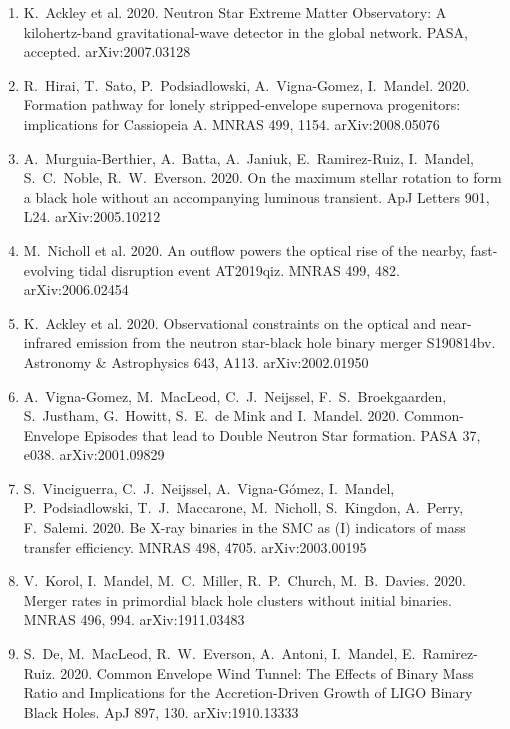 \documentclass[margin,line]{res}
\begin{document}
\begin{resume}
\begin{enumerate}
\item K.~Ackley et al. 2020. Neutron Star Extreme Matter Observatory: A kilohertz-band gravitational-wave detector in the global network. PASA, accepted.  arXiv:2007.03128 

\item R.~Hirai, T.~Sato, P.~Podsiadlowski, A.~Vigna-Gomez, I.~Mandel. 2020. Formation pathway for lonely stripped-envelope supernova progenitors: implications for Cassiopeia A.  MNRAS 499, 1154. arXiv:2008.05076

\item A.~Murguia-Berthier, A.~Batta, A.~Janiuk, E.~Ramirez-Ruiz, I.~Mandel, S.~C.~Noble, R.~W.~Everson.  2020.  On the maximum stellar rotation to form a black hole without an accompanying luminous transient.  ApJ Letters 901, L24.  arXiv:2005.10212

\item M.~Nicholl et al. 2020. An outflow powers the optical rise of the nearby, fast-evolving tidal disruption event AT2019qiz. MNRAS 499, 482.  arXiv:2006.02454

\item K.~Ackley et al. 2020. Observational constraints on the optical and near-infrared emission from the neutron star-black hole binary merger S190814bv.  Astronomy \& Astrophysics 643, A113.
arXiv:2002.01950

\item A.~Vigna-Gomez, M.~MacLeod, C.~J.~Neijssel, F.~S.~Broekgaarden, S.~Justham, G.~Howitt, S.~E.~de Mink and I.~Mandel.  2020. Common-Envelope Episodes that lead to Double Neutron Star formation.  PASA 37, e038.  arXiv:2001.09829 

\item S.~Vinciguerra, C.~J.~Neijssel, A.~Vigna-G\'{o}mez, I.~Mandel, P.~Podsiadlowski, T.~J.~Maccarone, M.~Nicholl, S.~Kingdon, A.~Perry, F.~Salemi.  2020. Be X-ray binaries in the SMC as (I) indicators of mass transfer efficiency.  MNRAS 498, 4705.  arXiv:2003.00195

\item V.~Korol, I.~Mandel, M.~C.~Miller, R.~P.~Church, M.~B.~Davies. 2020. Merger rates in primordial black hole clusters without initial binaries. MNRAS 496, 994.  arXiv:1911.03483

\item S.~De, M.~MacLeod, R.~W.~Everson, A.~Antoni, I.~Mandel, E.~Ramirez-Ruiz.  2020.  Common Envelope Wind Tunnel: The Effects of Binary Mass Ratio and Implications for the Accretion-Driven Growth of LIGO Binary Black Holes.  ApJ 897, 130.  arXiv:1910.13333


\end{enumerate}
\end{resume}
\end{document}
